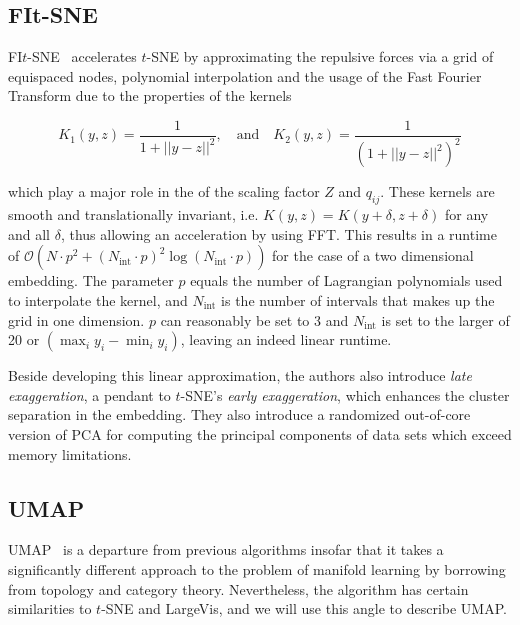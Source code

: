 \subsection{FIt-SNE}

FI$t$-SNE~\cite{fitsne} accelerates $t$-SNE by approximating the repulsive forces via a grid
of equispaced nodes, polynomial interpolation and the usage of the Fast Fourier
Transform due to the properties of the kernels

\begin{equation}
  K_1(y, z) = \frac{1}{1 + || y - z ||^2}, \quad \text{and} \quad K_2(y, z) = \frac{1}{(1 + || y - z ||^2)^2}
\end{equation}

which play a major role in the of the scaling factor $Z$ and $q_{ij}$. These
kernels are smooth and translationally invariant, i.e. $K(y, z) = K(y + \delta,
z + \delta)$ for any and all $\delta$, thus allowing an acceleration by using
FFT. This results in a runtime of $\mathcal{O}(N \cdot p^2 + (N_\text{int} \cdot p)^2
\log (N_\text{int} \cdot p))$ for the case of a two dimensional embedding. The
parameter $p$ equals the number of Lagrangian polynomials used to interpolate
the kernel, and $N_\text{int}$ is the number of intervals that makes up the
grid in one dimension. $p$ can reasonably be set to 3 and $N_\text{int}$ is set to the
larger of 20 or $(\max_i y_i - \min_i y_i)$, leaving an indeed linear runtime.

Beside developing this linear approximation, the authors also introduce \emph{late exaggeration},
a pendant to $t$-SNE's \emph{early exaggeration}, which enhances the cluster separation
in the embedding. They also introduce a randomized out-of-core version of PCA for computing
the principal components of data sets which exceed memory limitations.

\subsection{UMAP}

UMAP~\cite{umap} is a departure from previous algorithms insofar that it takes a significantly
different approach to the problem of manifold learning by borrowing from topology and category
theory. Nevertheless, the algorithm has certain similarities to $t$-SNE and LargeVis, and we
will use this angle to describe UMAP.


